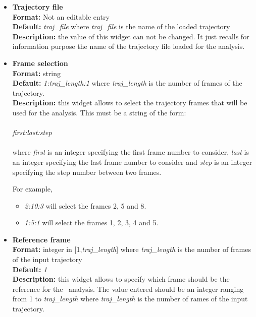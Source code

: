 \documentclass[a4paper,11pt]{report}
\begin{document}
\hypertarget{rmsd_trajectory_file}{}
\begin{itemize}
\item \textbf{Trajectory file}\\
\textbf{Format:} Not an editable entry\\
\textbf{Default:} \textit{traj\_file} where \textit{traj\_file} is the name of the loaded trajectory\\
\textbf{Description:} the value of this widget can not be changed. It just recalls for information purpose the name
of the trajectory file loaded for the analysis.

\hypertarget{rmsd_frame_selection}{}
\item \textbf{Frame selection}\\
\textbf{Format:} string\\
\textbf{Default:} \textit{1:traj\_length:1} where \textit{traj\_length} is the number of frames of the trajectory.\\
\textbf{Description:} this widget allows to select the trajectory frames that will be used for the analysis. This must
be a string of the form:
\\\\
\textit{first:last:step}
\\\\
where \textit{first} is an integer specifying the first frame number to consider, \textit{last} is an integer specifying the last 
frame number to consider and \textit{step} is an integer specifying the step number between two frames.

For example,
\begin{itemize}
\item \textit{2:10:3} will select the frames 2, 5 and 8.
\item \textit{1:5:1} will select the frames 1, 2, 3, 4 and 5.
\end{itemize}

\hypertarget{rmsd_reference_frame}{}
\item \textbf{Reference frame}\\
\textbf{Format:} integer in [1,\textit{traj\_length}] where \textit{traj\_length} is the number of frames of the input trajectory\\
\textbf{Default:} \textit{1}\\
\textbf{Description:} this widget allows to specify which frame should be the reference for the \RMSD\ analysis.
The value entered should be an integer ranging from 1 to \textit{traj\_length} where \textit{traj\_length} is the 
number of rames of the input trajectory.


\end{itemize}
\end{document}

